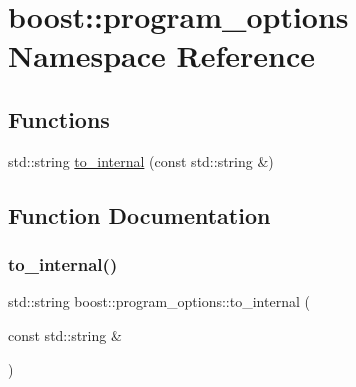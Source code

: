 \hypertarget{namespaceboost_1_1program__options}{}\section{boost\+:\+:program\+\_\+options Namespace Reference}
\label{namespaceboost_1_1program__options}
\subsection*{Functions}
\begin{DoxyCompactItemize}
\item 
std\+::string \mbox{\hyperlink{namespaceboost_1_1program__options_a62ea8cef2a8959ba5d6220b5b61a5dcb}{to\+\_\+internal}} (const std\+::string \&)
\end{DoxyCompactItemize}


\subsection{Function Documentation}
\mbox{\label{namespaceboost_1_1program__options_a62ea8cef2a8959ba5d6220b5b61a5dcb}} 
\subsubsection{\texorpdfstring{to\+\_\+internal()}{to\_internal()}}
{\footnotesize\ttfamily std\+::string boost\+::program\+\_\+options\+::to\+\_\+internal (\begin{DoxyParamCaption}\item[{const std\+::string \&}]{ }\end{DoxyParamCaption})}

